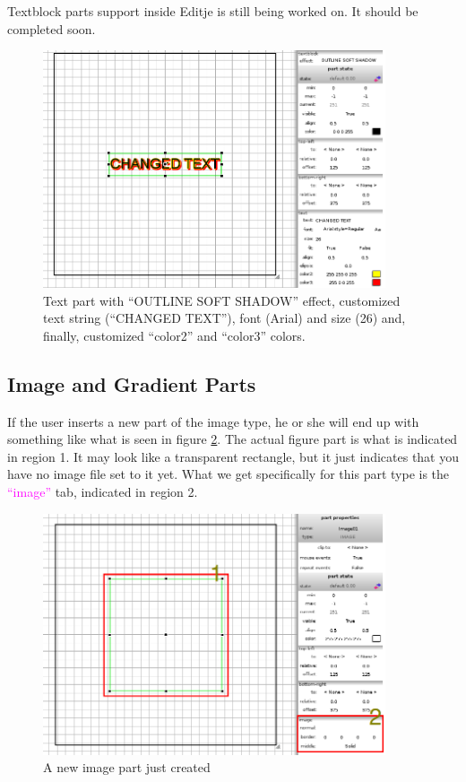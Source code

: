 \documentclass[a4paper]{profusion}
\newcommand{\GUILabel}[1]{\textcolor{magenta}{#1}}
\begin{document}
Textblock parts support inside Editje is still being worked on. It
should be completed soon.

\begin{figure}[h!]
  \centering
  \includegraphics[width=0.9\textwidth]{images/text_misc.png}
  \caption{Text part with ``OUTLINE SOFT SHADOW'' effect, customized
    text string (``CHANGED TEXT''), font (Arial) and size (26) and,
    finally, customized ``color2'' and ``color3'' colors.}
  \label{fig:text_misc}
\end{figure}

\subsection{Image and Gradient Parts}

If the user inserts a new part of the image type, he or she will end
up with something like what is seen in figure \ref{fig:new_image}.
The actual figure part is what is indicated in region 1. It may look
like a transparent rectangle, but it just indicates that you have no
image file set to it yet. What we get specifically for this part type
is the \GUILabel{``image''} tab, indicated in region 2.

\begin{figure}[h!]
  \centering
  \includegraphics[width=0.9\textwidth]{images/new_image.png}
  \caption{A new image part just created}
  \label{fig:new_image}
\end{figure}
\end{document}
